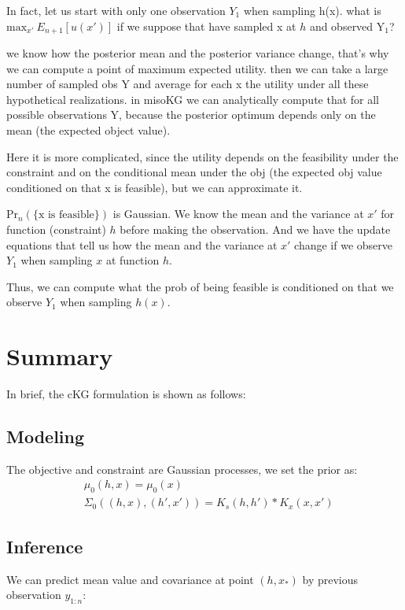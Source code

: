 \documentclass[12pt]{article}
\begin{document}
In fact, let us start with only one observation $Y_1$ when sampling h(x). what is $\text{max}_{x'}\  E_{n+1}[u(x')]$ if we suppose that have sampled x at $h$ and observed $\text{Y}_1$?

we know how the posterior mean and the posterior variance change, that's why we can compute a point of maximum expected utility. then we can take a large number of sampled obs Y and average for each x the utility under all these hypothetical realizations. in misoKG we can analytically compute that for all possible observations Y, because the posterior optimum depends only on the mean (the expected object value).

Here it is more complicated, since the utility depends on the feasibility under the constraint and on the conditional mean under the obj (the expected obj value conditioned on that x is feasible), but we can approximate it.

$\text{Pr}_n(\{\text{x is feasible}\})$ is Gaussian. We know the mean and the variance at $x'$ for function (constraint) $h$ before making the observation.
And we have the update equations that tell us how the mean and the variance at $x'$ change if we observe $Y_1$ when sampling $x$ at function $h$.


Thus, we can compute what the prob of being feasible is conditioned on that we observe $Y_1$ when sampling $h(x)$.

\section{Summary}
In brief, the cKG formulation is shown as follows:

\subsection{Modeling}
The objective and constraint are Gaussian processes, we set the prior as:
\begin{equation*}
\begin{aligned}
&\mu_0(h,x) = \mu_0(x)\\
&\Sigma_0((h,x),(h',x')) = K_s(h,h')*K_x(x,x')
\end{aligned}
\end{equation*}
\subsection{Inference}
We can predict mean value and covariance at point $(h,x_*)$ by previous observation $y_{1:n}$:
\end{document}
